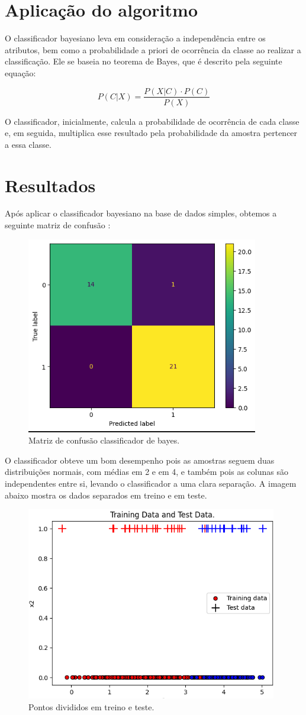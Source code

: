 \documentclass{article}
\begin{document}
 \newpage

 \section{Aplicação do algoritmo}

 O classificador bayesiano leva em consideração a independência entre os atributos, bem como a probabilidade a priori de ocorrência da classe ao realizar a classificação. Ele se baseia no teorema de Bayes, que é descrito pela seguinte equação:
 
 \[
P(C|X) = \frac{P(X|C) \cdot P(C)}{P(X)}
\]

O classificador, inicialmente, calcula a probabilidade de ocorrência de cada classe e, em seguida, multiplica esse resultado pela probabilidade da amostra pertencer a essa classe.

\section{Resultados}

Após aplicar o classificador bayesiano na base de dados simples, obtemos a seguinte matriz de confusão :

\begin{figure}[h]
    \centering
    \includegraphics[width=0.5\linewidth]{conf_matrix_bayes.png}
    \caption{Matriz de confusão classificador de bayes.}
    \label{fig:kernel_types}
 \end{figure}

 O classificador obteve um bom desempenho pois as amostras seguem duas distribuições normais, com médias em 2 e em 4, e também pois as colunas são independentes entre si, levando o classificador a uma clara separação. A imagem abaixo mostra os dados separados em treino e em teste.

 \begin{figure}[h]
    \centering
    \includegraphics[width=0.5\linewidth]{train_test_points.png}
    \caption{Pontos divididos em treino e teste.}
    \label{fig:kernel_types}
 \end{figure}
 \newpage
\end{document}
